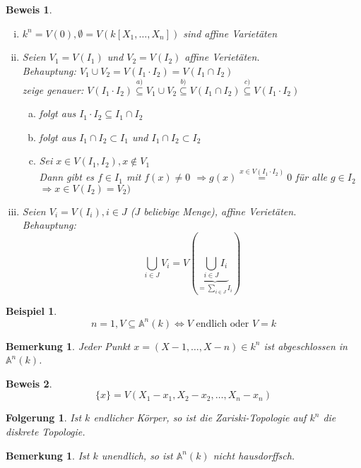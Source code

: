 \documentclass[a4paper,12pt]{report}
\theoremstyle{break}
\newtheorem{Bem}[Def]{Bemerkung}
\newtheorem{Folg}[Def]{Folgerung}
\newtheorem{Bsp}[Def]{Beispiel}
\theoremstyle{nonumberbreak}
\newtheorem{Bew}{Beweis}
\theoremstyle{nonumberplain}
\newcommand{\A}{\mathbb{A}}
\begin{document}
\begin{Bew}\begin{enumerate}[i)]
\item
	$k^n=V(0), \emptyset=V(k[X_1,\dots ,X_n])$ sind affine Variet\"aten
\item
	Seien $V_1=V(I_1)$ und $V_2 =V(I_2)$ affine Veriet\"aten.\\
	\emph{Behauptung:} $V_1 \cup V_2 =V(I_1\cdot I_2)=V(I_1\cap I_2)$\\
	zeige genauer: $V(I_1\cdot I_2) \overset{a)}{\subseteq} V_1 \cup V_2 \overset{b)}{\subseteq} V(I_1\cap I_2) \overset{c)}{\subseteq} V(I_1\cdot I_2)$
	\begin{enumerate}[a)]
	\item[c)] folgt aus $I_1\cdot I_2 \subseteq I_1 \cap I_2$
	\item[b)] folgt aus $I_1 \cap I_2 \subset I_1$ und $I_1 \cap I_2 \subset I_2$
	\item[a)] Sei $x\in V(I_1,I_2), x\notin V_1$\\
		Dann gibt es $f\in I_1$ mit $f(x) \not= 0$ $\Rightarrow  g(x) \stackrel{x\in V(I_1\cdot I_2)}= 0$ f\"ur alle $g\in I_2$\\
		$\Rightarrow x\in V(I_2) = V_2)$
	\end{enumerate}
\item
	Seien $V_i = V(I_i),i \in J$ ($J$ beliebige Menge), affine Veriet\"aten.\\
	\emph{Behauptung:} \[ \bigcup_{i\in J} V_i = V(\underbrace{\bigcup_{i\in J} I_i}_{= \sum_{i\in J} I_i}) \]
\end{enumerate}\end{Bew}

\begin{Bsp}\[
	n = 1, V \subseteq \A ^n(k) \Leftrightarrow V \textrm{ endlich oder } V=k
\]\end{Bsp}

\begin{Bem}
Jeder Punkt $x=(X-1,\dots ,X-n)\in k^n$ ist abgeschlossen in $\A ^n(k)$.
\end{Bem}

\begin{Bew}\[
\{x\}= V(X_1-x_1,X_2-x_2,\dots ,X_n-x_n)
\]\end{Bew}

\begin{Folg}
Ist $k$ endlicher K\"orper, so ist die Zariski-Topologie auf $k^n$ die diskrete Topologie.
\end{Folg}

\begin{Bem}
Ist $k$ unendlich, so ist $\A ^n(k)$ nicht hausdorffsch.
\end{Bem}
\end{document}
